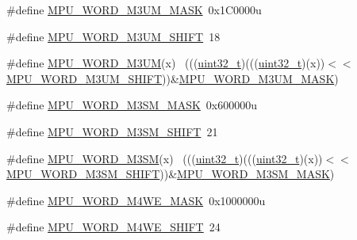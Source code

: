\begin{DoxyCompactItemize}
\item 
\#define \hyperlink{group___m_p_u___register___masks_gaaae46e6e46ff4089de2e00ef4f10396f}{M\+P\+U\+\_\+\+W\+O\+R\+D\+\_\+\+M3\+U\+M\+\_\+\+M\+A\+SK}~0x1\+C0000u
\item 
\#define \hyperlink{group___m_p_u___register___masks_ga2256d09a97da4bc4e20aceefdd6870f1}{M\+P\+U\+\_\+\+W\+O\+R\+D\+\_\+\+M3\+U\+M\+\_\+\+S\+H\+I\+FT}~18
\item 
\#define \hyperlink{group___m_p_u___register___masks_ga4613804e66aa7ba84932de4f06b9eaf6}{M\+P\+U\+\_\+\+W\+O\+R\+D\+\_\+\+M3\+UM}(x)                                              ~(((\hyperlink{_p_e___types_8h_a33594304e786b158f3fb30289278f5af}{uint32\+\_\+t})(((\hyperlink{_p_e___types_8h_a33594304e786b158f3fb30289278f5af}{uint32\+\_\+t})(x))$<$$<$\hyperlink{group___m_p_u___register___masks_ga2256d09a97da4bc4e20aceefdd6870f1}{M\+P\+U\+\_\+\+W\+O\+R\+D\+\_\+\+M3\+U\+M\+\_\+\+S\+H\+I\+FT}))\&\hyperlink{group___m_p_u___register___masks_gaaae46e6e46ff4089de2e00ef4f10396f}{M\+P\+U\+\_\+\+W\+O\+R\+D\+\_\+\+M3\+U\+M\+\_\+\+M\+A\+SK})
\item 
\#define \hyperlink{group___m_p_u___register___masks_ga66fa2f8378ee3158e24b8733413da43d}{M\+P\+U\+\_\+\+W\+O\+R\+D\+\_\+\+M3\+S\+M\+\_\+\+M\+A\+SK}~0x600000u
\item 
\#define \hyperlink{group___m_p_u___register___masks_ga41a8f42d1e7fab735444f5576ccbf61e}{M\+P\+U\+\_\+\+W\+O\+R\+D\+\_\+\+M3\+S\+M\+\_\+\+S\+H\+I\+FT}~21
\item 
\#define \hyperlink{group___m_p_u___register___masks_gaff4b0e7afa09ba14fa78b6338d2cd5af}{M\+P\+U\+\_\+\+W\+O\+R\+D\+\_\+\+M3\+SM}(x)                                              ~(((\hyperlink{_p_e___types_8h_a33594304e786b158f3fb30289278f5af}{uint32\+\_\+t})(((\hyperlink{_p_e___types_8h_a33594304e786b158f3fb30289278f5af}{uint32\+\_\+t})(x))$<$$<$\hyperlink{group___m_p_u___register___masks_ga41a8f42d1e7fab735444f5576ccbf61e}{M\+P\+U\+\_\+\+W\+O\+R\+D\+\_\+\+M3\+S\+M\+\_\+\+S\+H\+I\+FT}))\&\hyperlink{group___m_p_u___register___masks_ga66fa2f8378ee3158e24b8733413da43d}{M\+P\+U\+\_\+\+W\+O\+R\+D\+\_\+\+M3\+S\+M\+\_\+\+M\+A\+SK})
\item 
\#define \hyperlink{group___m_p_u___register___masks_gac3a983687d94df3019c562fa26c8d07e}{M\+P\+U\+\_\+\+W\+O\+R\+D\+\_\+\+M4\+W\+E\+\_\+\+M\+A\+SK}~0x1000000u
\item 
\#define \hyperlink{group___m_p_u___register___masks_gaa32f6731588dff2a7e5ee20e10a86937}{M\+P\+U\+\_\+\+W\+O\+R\+D\+\_\+\+M4\+W\+E\+\_\+\+S\+H\+I\+FT}~24
\item 

\end{DoxyCompactItemize}

